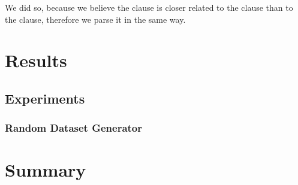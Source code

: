 \noindent{}We did so, because we believe the  clause is closer
related to the  clause than to the 
clause, therefore we parse it in the same way.

\chapter{Results\revision}
\label{chap:Results}

\section{Experiments}

\subsection{Random Dataset Generator}

\chapter*{Summary\revision}



